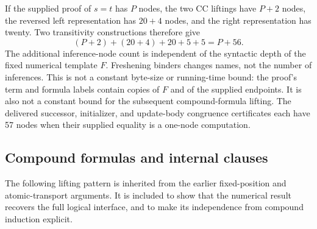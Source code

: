 If the supplied proof of $s=t$ has $P$ nodes, the two CC liftings have
$P+2$ nodes, the reversed left representation has $20+4$ nodes,
and the right representation has twenty. Two transitivity constructions
therefore give
\[
                  (P+2)+(20+4)+20+5+5=P+56.
\]
The additional inference-node count is independent of the syntactic
depth of the fixed numerical template $F$. Freshening binders changes
names, not the number of inferences. This is not a constant byte-size
or running-time bound: the proof's term and formula labels contain
copies of $F$ and of the supplied endpoints. It is also not a constant
bound for the subsequent compound-formula lifting. The delivered
successor, initializer, and update-body congruence certificates each
have 57 nodes when their supplied equality is a one-node computation.

\subsection{Compound formulas and internal clauses}

The following lifting pattern is inherited from the earlier
fixed-position and atomic-transport arguments. It is included to show
that the numerical result recovers the full logical interface, and to
make its independence from compound induction explicit.

